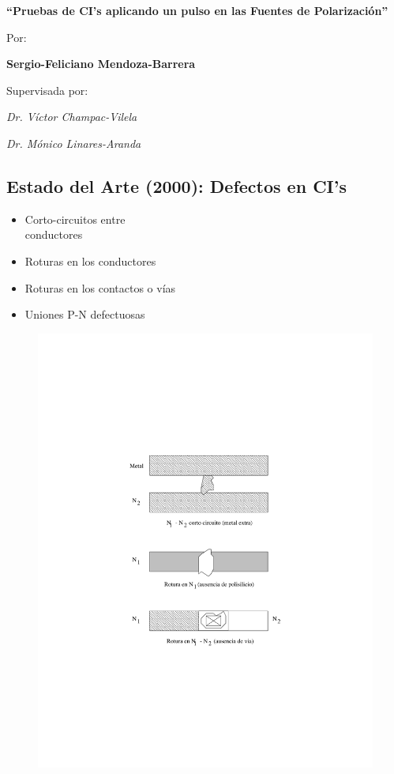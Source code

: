 \documentclass[
paper=128mm:96mm, %
fontsize=11pt, %
pagesize, %
parskip=half-, %
]{scrartcl} %
\newcommand*{\mygreen}[1]{\textcolor{mygreen}{#1}}
\newcommand*{\myblue}[1]{\textcolor{myblue}{#1}}
\newcommand*{\mybrown}[1]{\textcolor{mybrown}{#1}}
\newcommand*{\myred}[1]{\textcolor{myred}{#1}}
\theoremstyle{mythmstyle} %
\begin{document}
\textbf{``Pruebas de CI's aplicando un pulso en las Fuentes de Polarización''}

   Por:

   \textbf{Sergio-Feliciano Mendoza-Barrera}

   Supervisada por:

   \textit{Dr. Víctor Champac-Vilela}

   \textit{Dr. Mónico Linares-Aranda}

\clearpage


\subsection{Estado del Arte (2000): Defectos en CI's}

\begin{multicols}{2} %
\begin{itemize}
  \item Corto-circuitos entre\\conductores
  \item Roturas en los conductores
  \item Roturas en los contactos o vías
  \item Uniones P-N defectuosas
\end{itemize}
\end{multicols}

\begin{figure}[h]
\centering\includegraphics[width=0.23\linewidth]{defectos}
\end{figure}



\end{document}
